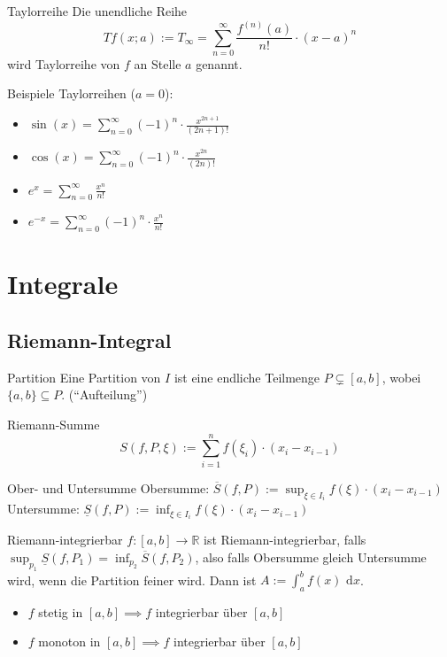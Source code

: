 \documentclass[a4paper,10pt]{article}
\def\sumn{\sum\limits_{n=0}^{\infty}}
\def\R{\mathbb{R}}
\def\dx{\text{ d}x}
\begin{document}
\begin{mainbox}{Taylorreihe}
 Die unendliche Reihe
 $$Tf(x;a) := T_\infty = \sumn \frac{f^{(n)}(a)}{n!} \cdot (x-a)^n$$
 wird Taylorreihe von $f$ an Stelle $a$ genannt.
\end{mainbox}
Beispiele Taylorreihen ($a = 0$):
\begin{itemize}
 \item $\sin(x) = \sumn (-1)^n \cdot \frac{x^{2n+1}}{(2n+1)!}$
 \item $\cos(x) = \sumn (-1)^n \cdot \frac{x^{2n}}{(2n)!}$
 \item $e^x = \sumn \frac{x^n}{n!}$
 \item $e^{-x} = \sumn (-1)^n \cdot \frac{x^n}{n!}$
\end{itemize}

\section{Integrale}
\subsection{Riemann-Integral}
\begin{subbox}{Partition}
 Eine Partition von $I$ ist eine endliche Teilmenge $P \subsetneq [a,b]$, wobei $\{a,b\} \subseteq P$. (``Aufteilung'')
\end{subbox}
\begin{mainbox}{Riemann-Summe}
 $$S(f, P, \xi) := \sum_{i=1}^n f(\xi_i) \cdot (x_i - x_{i-1})$$
\end{mainbox}
\begin{subbox}{Ober- und Untersumme}
 Obersumme: $\overline{S}(f,P) := \sup_{\xi \in I_i} f(\xi) \cdot (x_i - x_{i-1})$ \\
 Untersumme: $\underline{S}(f,P) := \inf_{\xi \in I_i} f(\xi) \cdot (x_i - x_{i-1})$
\end{subbox}
\begin{mainbox}{Riemann-integrierbar}
 $f:[a,b] \to \R$ ist Riemann-integrierbar, falls $\sup_{p_1} \underline{S}(f,P_1) = \inf_{p_2}\overline{S}(f, P_2)$, also falls Obersumme gleich Untersumme wird, wenn die Partition feiner wird. Dann ist $A := \int_a^b f(x)\dx$.
\end{mainbox}
\begin{itemize}
 \item $f$ stetig in $[a,b] \implies f$ integrierbar über $[a,b]$
 \item $f$ monoton in $[a,b] \implies f$ integrierbar über $[a,b]$
\end{itemize}
\end{document}
